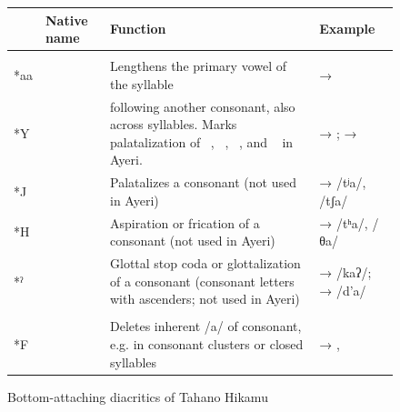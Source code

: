 \begin{figure}
\caption{Bottom-attaching diacritics of Tahano Hikamu}
\begin{tabu} to 
\toprule
\tableheaderfont

	& Native name
	& Function
	& Example
	\\
	
\toprule

\tablesubheaderfont{}\\

\midrule

*aa
	& 
	& Lengthens the primary vowel of the syllable
	&  → 
	\\

\midrule
	
*Y
	& 
	&  following another consonant, also across syllables. Marks 
		palatalization of ~, ~, 
		~, and ~ in Ayeri.
	&  → ;  → 
	\\
	
\midrule
	
*J
	& 
	& Palatalizes a consonant (not used in Ayeri)
	&  →  /tʲa/, /tʃa/
	\\
	
\midrule
	
*H
	& 
	& Aspiration or frication of a consonant (not used in Ayeri)
	&  →  /tʰa/, {/θa/}
	\\
	
\midrule
	
*\hspace{-.25em}ˀ
	& 
	& Glottal stop coda or glottalization of a consonant (consonant letters 
		with ascenders; not used in Ayeri)
	&  →  /kaʔ/;  →  /d’a/
	\\

\midrule

\tablesubheaderfont{}\\

\midrule

*F
	& 
	& Deletes inherent /a/ of consonant, e.g. in consonant clusters or 
		closed syllables
	&  → , 
	\\
	

\end{tabu}
\end{figure}
